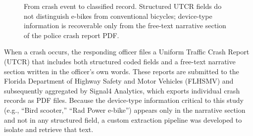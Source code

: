 \documentclass[numbered]{trbunofficial}
\begin{document}
\begin{figure}
\centering
{}
\caption{From crash event to classified record. Structured UTCR fields do not distinguish e-bikes from conventional bicycles; device-type information is recoverable only from the free-text narrative section of the police crash report PDF.}
\label{fig:pipeline}
\end{figure}

When a crash occurs, the responding officer files a Uniform Traffic Crash Report (UTCR) that includes both structured coded fields and a free-text narrative section written in the officer's own words. These reports are submitted to the Florida Department of Highway Safety and Motor Vehicles (FLHSMV) and subsequently aggregated by Signal4 Analytics, which exports individual crash records as PDF files. Because the device-type information critical to this study (e.g., ``Bird scooter,'' ``Rad Power e-bike'') appears only in the narrative section and not in any structured field, a custom extraction pipeline was developed to isolate and retrieve that text.
\end{document}
